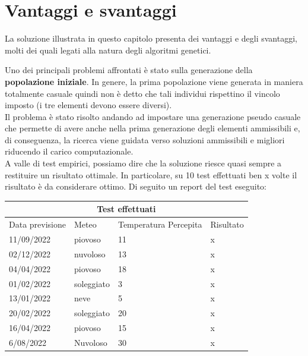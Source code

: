 \documentclass[a4paper, 11pt, oneside]{report}
\begin{document}
            \section{Vantaggi e svantaggi}
            La soluzione illustrata in questo capitolo presenta dei vantaggi e degli svantaggi, molti dei quali legati
            alla natura degli algoritmi genetici.
            \par \noindent Uno dei principali problemi affrontati è stato sulla generazione della \textbf{popolazione iniziale}.
            In genere, la prima popolazione viene generata in maniera totalmente casuale quindi non è detto che
            tali individui rispettino il vincolo imposto (i tre elementi devono essere diversi).\\
            Il problema è stato risolto andando ad impostare una generazione pseudo casuale che permette
            di avere anche nella prima generazione degli elementi ammissibili e, di conseguenza,
            la ricerca viene guidata verso soluzioni ammissibili e migliori riducendo il carico computazionale.\\
            A valle di test empirici, possiamo dire che la soluzione riesce quasi sempre a restituire un risultato ottimale.
            In particolare, su 10 test effettuati ben x volte il risultato è da considerare ottimo.
            Di seguito un report del test eseguito:
            \begin{center}
                \begin{tabular}{ |p{3cm}|p{2cm}|p{2cm}||p{4cm}|}
                    \hline
                    \multicolumn{4}{|c|}{Test effettuati} \\
                    \hline
                    Data previsione & Meteo & Temperatura Percepita & Risultato\\
                    \hline
                    11/09/2022 & piovoso  & 11 & x\\
                    \hline
                    02/12/2022 & nuvoloso  & 13 & x\\
                    \hline
                    04/04/2022 & piovoso  & 18 & x\\
                    \hline
                    01/02/2022 & soleggiato  & 3 & x\\
                    \hline
                    13/01/2022 & neve  & 5 & x\\
                    \hline
                    20/02/2022 & soleggiato  & 20 & x\\
                    \hline
                    16/04/2022 & piovoso  & 15 & x\\
                    \hline
                    6/08/2022 & Nuvoloso  & 30 & x\\
                    \hline
                \end{tabular}
            \end{center}
\end{document}
